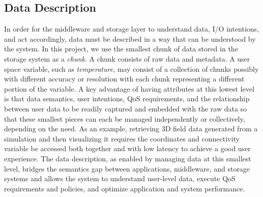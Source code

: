 \subsection{Data Description}
In order for the middleware and storage layer to understand data, I/O
intentions, and act accordingly, data must be described in a way that can be
understood by the system. In this project, we use the smallest chunk of data
stored in the storage system as a \textit{chunk}.  A chunk consists of raw
data and metadata.  A user space variable, such as \textit{temperature}, may
consist of a collection of chunks possibly with different accuracy or
resolution with each chunk representing a different portion of the variable.
A key advantage of having attributes at this lowest level is that data
semantics, user intentions, QoS requirements, and the relationship between user
data to be readily captured and embedded with the raw data so that these
smallest pieces can each be managed independently or collectively, depending on
the need. As an example, retrieving 3D field data generated from a simulation
and then visualizing it requires the coordinates and connectivity variable be
accessed both together and with low latency to achieve a good user experience.
The data description, as enabled by managing data at this smallest level,
bridges the semantics gap between applications, middleware, and storage
systems and allows the system to understand user-level data, execute QoS
requirements and policies, and optimize application and system performance.



